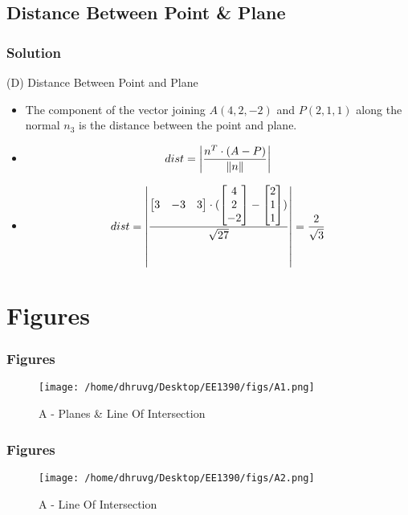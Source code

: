 \documentclass{beamer}
\begin{document}
 \subsection{Distance Between Point \& Plane}
 \begin{frame}

\frametitle{Solution}

(D) Distance Between Point and Plane
\begin{itemize}
\item<1-> The component of the vector joining $A(4,2,-2)$ and $P(2,1,1)$ along the normal $n_{3}$ is the distance between the point and plane.
\item <2->\[
    dist = \abs{\frac{n^{T}\cdot (A-P)}{\norm{n}}}
\]
\item<3-> \[
    dist = \abs{\frac{\begin{bmatrix}3 & -3 & 3\end{bmatrix}\cdot(
    \begin{bmatrix}4\\2\\-2\end{bmatrix}-
    \begin{bmatrix}2\\1\\1\end{bmatrix})
    }{\sqrt{27}}} = \frac{2}{\sqrt{3}}
\]
\end{itemize}
\end{frame}
 

\section{Figures}

\begin{frame}
\frametitle{Figures}
\begin{figure}[H]
    \texttt{[image: /home/dhruvg/Desktop/EE1390/figs/A1.png]}
    \caption{A - Planes \& Line Of Intersection}
    \label{A}
\end{figure}
\end{frame}
 
\begin{frame}
\frametitle{Figures}
\begin{figure}[H]
    \texttt{[image: /home/dhruvg/Desktop/EE1390/figs/A2.png]}
    \caption{A - Line Of Intersection}
    \label{A}
\end{figure}
\end{frame}
 
\end{document}
